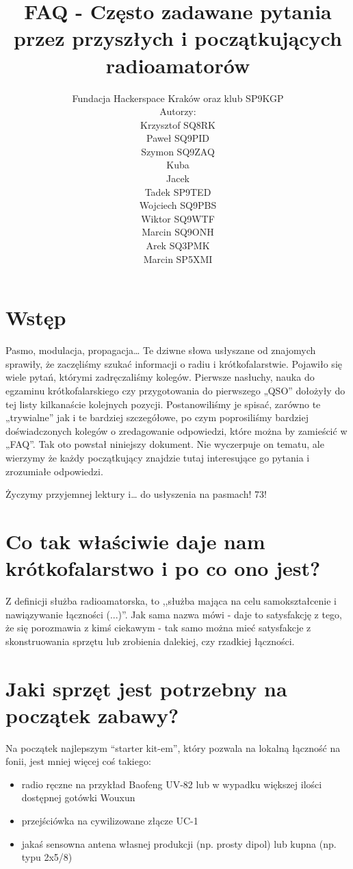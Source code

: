 \documentclass[a4paper,12pt]{article}
\title{\textbf{FAQ - Często zadawane pytania przez przyszłych i początkujących radioamatorów}}
\author{Fundacja Hackerspace Kraków
oraz klub SP9KGP\\
Autorzy:\\
Krzysztof SQ8RK\\
Paweł SQ9PID\\
Szymon SQ9ZAQ\\
Kuba\\
Jacek\\
Tadek SP9TED\\
Wojciech SQ9PBS\\
Wiktor SQ9WTF\\
Marcin SQ9ONH\\
Arek SQ3PMK\\
Marcin SP5XMI}
\begin{document}
\maketitle

\newpage
\newpage

\section{Wstęp}
Pasmo, modulacja, propagacja… Te dziwne słowa usłyszane od znajomych sprawiły, że zaczęliśmy szukać informacji o radiu i krótkofalarstwie. Pojawiło się wiele pytań, którymi zadręczaliśmy kolegów. Pierwsze nasłuchy, nauka do egzaminu krótkofalarskiego czy przygotowania do pierwszego „QSO” dołożyły do tej listy kilkanaście kolejnych pozycji. Postanowiliśmy je spisać, zarówno te „trywialne” jak i te bardziej szczegółowe, po czym poprosiliśmy bardziej doświadczonych kolegów o zredagowanie odpowiedzi, które można by zamieścić w „FAQ”. Tak oto powstał niniejszy dokument. Nie wyczerpuje on tematu, ale wierzymy że każdy początkujący znajdzie tutaj interesujące go pytania i zrozumiałe odpowiedzi. 

Życzymy przyjemnej lektury i… do usłyszenia na pasmach! 73!

\section{Co tak właściwie daje nam krótkofalarstwo i po co ono jest?}
Z definicji służba radioamatorska, to ,,służba mająca na celu samokształcenie i nawiązywanie łączności (...)''. Jak sama nazwa mówi - daje to satysfakcję z tego, że się porozmawia z kimś ciekawym - tak samo można mieć satysfakcje z skonstruowania sprzętu lub zrobienia dalekiej, czy rzadkiej łączności.

\section{Jaki sprzęt jest potrzebny na początek zabawy?}
Na początek najlepszym “starter kit-em”, który pozwala na lokalną łączność na fonii, jest mniej więcej coś takiego:
\begin{itemize}
 \item radio ręczne na przykład Baofeng UV-82 lub w wypadku większej ilości dostępnej gotówki Wouxun
 \item przejściówka na cywilizowane złącze UC-1
 \item jakaś sensowna antena własnej produkcji (np. prosty dipol) lub kupna (np. typu 2x5/8)
\end{itemize}
\end{document}
